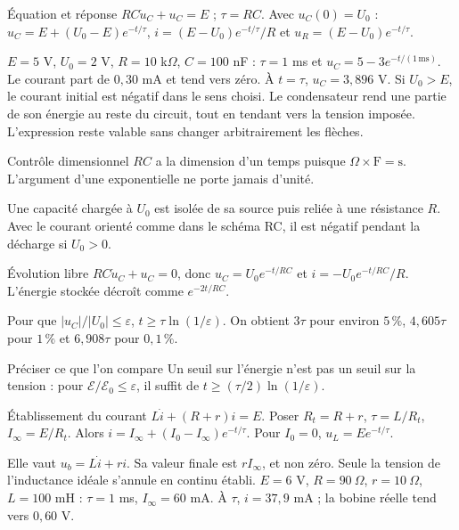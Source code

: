 \begin{loi}{Équation et réponse}
$RC\dot u_C+u_C=E$ ; $\tau=RC$. Avec $u_C(0)=U_0$ : $u_C=E+(U_0-E)e^{-t/\tau}$, $i=(E-U_0)e^{-t/\tau}/R$ et $u_R=(E-U_0)e^{-t/\tau}$.
\end{loi}
$E=5$ V, $U_0=2$ V, $R=10$ k$\Omega$, $C=100$ nF : $\tau=1$ ms et $u_C=5-3e^{-t/(1\,\mathrm{ms})}$. Le courant part de $0{,}30$ mA et tend vers zéro. À $t=\tau$, $u_C=3{,}896$ V.
Si $U_0>E$, le courant initial est négatif dans le sens choisi. Le condensateur rend une partie de son énergie au reste du circuit, tout en tendant vers la tension imposée. L’expression reste valable sans changer arbitrairement les flèches.
\begin{methode}{Contrôle dimensionnel}
$RC$ a la dimension d’un temps puisque $\Omega\times\mathrm F=\mathrm s$. L’argument d’une exponentielle ne porte jamais d’unité.
\end{methode}


Une capacité chargée à $U_0$ est isolée de sa source puis reliée à une résistance $R$. Avec le courant orienté comme dans le schéma RC, il est négatif pendant la décharge si $U_0>0$.
\begin{loi}{Évolution libre}
$RC\dot u_C+u_C=0$, donc $u_C=U_0e^{-t/RC}$ et $i=-U_0e^{-t/RC}/R$. L’énergie stockée décroît comme $e^{-2t/RC}$.
\end{loi}
Pour que $|u_C|/|U_0|\leq\varepsilon$, $t\geq\tau\ln(1/\varepsilon)$. On obtient $3\tau$ pour environ $5\,\%$, $4{,}605\tau$ pour $1\,\%$ et $6{,}908\tau$ pour $0{,}1\,\%$.
\begin{piege}{Préciser ce que l’on compare}
Un seuil sur l’énergie n’est pas un seuil sur la tension : pour $\mathcal E/\mathcal E_0\leq\varepsilon$, il suffit de $t\geq(\tau/2)\ln(1/\varepsilon)$.
\end{piege}


\begin{loi}{Établissement du courant}
$L\dot i+(R+r)i=E$. Poser $R_t=R+r$, $\tau=L/R_t$, $I_\infty=E/R_t$. Alors $i=I_\infty+(I_0-I_\infty)e^{-t/\tau}$. Pour $I_0=0$, $u_L=Ee^{-t/\tau}$.
\end{loi}
Elle vaut $u_b=L\dot i+ri$. Sa valeur finale est $rI_\infty$, et non zéro. Seule la tension de l’inductance idéale s’annule en continu établi.
$E=6$ V, $R=90\ \Omega$, $r=10\ \Omega$, $L=100$ mH : $\tau=1$ ms, $I_\infty=60$ mA. À $\tau$, $i=37{,}9$ mA ; la bobine réelle tend vers $0{,}60$ V.


